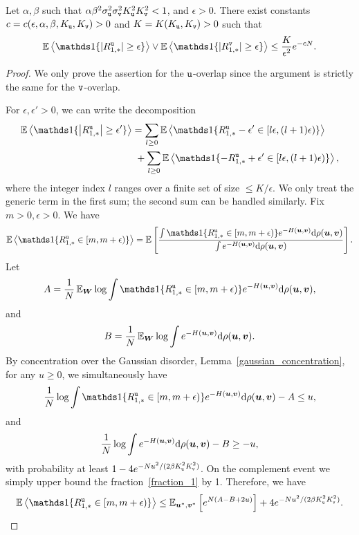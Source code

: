 \documentclass[final,12pt]{colt2018} %
\newcommand{\utt}{\textup{\texttt{u}}}
\newcommand{\vtt}{\textup{\texttt{v}}}
\renewcommand{\u}{\bm{u}}
\renewcommand{\v}{\bm{v}}
\newcommand{\W}{\bm{W}}
\begin{document}
\begin{proposition}\label{convergence_in_probability}
Let $\alpha,\beta$ such that $\alpha \beta^2 \sigma_\utt^2\sigma_\vtt^2K_\utt^2K_\vtt^2<1$, and $\epsilon>0$. There exist constants $c = c(\epsilon,\alpha,\beta,K_\utt,K_\vtt)>0$ and $K = K(K_{\utt},K_{\vtt})>0$ such that
\[\E \left\langle \indi \{ |R^{\utt}_{1,*}| \ge \epsilon \} \right\rangle  \vee \E \left\langle \indi \{ |R^{\vtt}_{1,*}| \ge \epsilon \} \right\rangle \le \frac{K}{\epsilon^2} e^{-cN}.\] 
\end{proposition}
\begin{proof}
We only prove the assertion for the $\utt$-overlap since the argument is strictly the same for the $\vtt$-overlap.
 
For $\epsilon,\epsilon'>0$, we can write the decomposition
\begin{align*}
\E \left\langle \indi \{ \abs{R^{\utt}_{1,*}} \ge \epsilon' \} \right\rangle &= \sum_{l \ge 0} \E \left\langle \indi \{ R^{\utt}_{1,*} -\epsilon' \in [l\epsilon,(l+1)\epsilon) \} \right\rangle \\
&~ +\sum_{l \ge 0} \E \left\langle \indi \{ -R^{\utt}_{1,*} +\epsilon' \in [l\epsilon,(l+1)\epsilon) \} \right\rangle,
\end{align*}
where the integer index $l$ ranges over a finite set of size $\le K/\epsilon$. We only treat the generic term in the first sum; the second sum can be handled similarly.  
Fix $m >0, \epsilon>0$. We have
\begin{equation}\label{fraction_1}
\E \left\langle \indi \{ R^{\utt}_{1,*} \in [m,m+\epsilon) \} \right\rangle = \E \left[\frac{\int \indi \{ R^{\utt}_{1,*} \in [m,m+\epsilon)\}e^{-H(\u,\v)}\rmd\rho(\u,\v)}{\int e^{-H(\u,\v)}\rmd\rho(\u,\v)}\right].
\end{equation}
Let 
\[A = \frac{1}{N} \E_{\W}\log \int \indi\{R^{\utt}_{1,*} \in [m,m+\epsilon)\}e^{-H(\u,\v)}\rmd\rho(\u,\v),\]
and
\[B = \frac{1}{N} \E_{\W}\log \int e^{-H(\u,\v)}\rmd\rho(\u,\v).\]
By concentration over the Gaussian disorder, Lemma~\ref{gaussian_concentration}, for any $u \ge0$, we simultaneously have
\[\frac{1}{N}\log \int \indi\{R^{\utt}_{1,*} \in [m,m+\epsilon)\}e^{-H(\u,\v)}\rmd\rho(\u,\v) - A \le u,\] 
and
\[\frac{1}{N} \log \int e^{-H(\u,\v)}\rmd\rho(\u,\v) - B \ge -u,\]
with probability at least $1-4e^{-Nu^2/(2\beta K_{\utt}^2 K_{\vtt}^2)}$. 
On the complement event we simply upper bound the fraction~\eqref{fraction_1} by 1. Therefore, we have
\begin{equation*}\label{fraction_2}
\E \left\langle \indi \{ R^{\utt}_{1,*} \in [m,m+\epsilon) \} \right\rangle \le \E_{\u^*,\v^*}\left[e^{N( A- B+2u)}\right] + 4e^{-Nu^2/(2\beta K_{\utt}^2 K_{\vtt}^2)}.

\end{equation*}
\end{proof}
\end{document}
